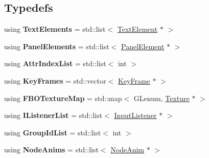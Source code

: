 \subsection*{Typedefs}
\begin{DoxyCompactItemize}
\item 
\hypertarget{namespaceEngine_a115b24f9c69682efbc9f470b471c05a3}{}using {\bfseries Text\+Elements} = std\+::list$<$ \hyperlink{classEngine_1_1TextElement}{Text\+Element} $\ast$ $>$\label{namespaceEngine_a115b24f9c69682efbc9f470b471c05a3}

\item 
\hypertarget{namespaceEngine_a0599e1309a8e5e56f947da08f8fde795}{}using {\bfseries Panel\+Elements} = std\+::list$<$ \hyperlink{classEngine_1_1PanelElement}{Panel\+Element} $\ast$ $>$\label{namespaceEngine_a0599e1309a8e5e56f947da08f8fde795}

\item 
\hypertarget{namespaceEngine_a86e109fbba3731eb26d862aa13c54761}{}using {\bfseries Attr\+Index\+List} = std\+::list$<$ int $>$\label{namespaceEngine_a86e109fbba3731eb26d862aa13c54761}

\item 
\hypertarget{namespaceEngine_a8c55142fb5e026b37f38e600d218440e}{}using {\bfseries Key\+Frames} = std\+::vector$<$ \hyperlink{classEngine_1_1KeyFrame}{Key\+Frame} $\ast$ $>$\label{namespaceEngine_a8c55142fb5e026b37f38e600d218440e}

\item 
\hypertarget{namespaceEngine_a855a7eb9d97b77ebc0d287a661ae631b}{}using {\bfseries F\+B\+O\+Texture\+Map} = std\+::map$<$ G\+Lenum, \hyperlink{classEngine_1_1Texture}{Texture} $\ast$ $>$\label{namespaceEngine_a855a7eb9d97b77ebc0d287a661ae631b}

\item 
\hypertarget{namespaceEngine_a1d515358567cf5c93f071411d6d59b74}{}using {\bfseries I\+Listener\+List} = std\+::list$<$ \hyperlink{classEngine_1_1InputListener}{Input\+Listener} $\ast$ $>$\label{namespaceEngine_a1d515358567cf5c93f071411d6d59b74}

\item 
\hypertarget{namespaceEngine_ab44f8e130652180f40a889d32f56f94e}{}using {\bfseries Group\+Id\+List} = std\+::list$<$ int $>$\label{namespaceEngine_ab44f8e130652180f40a889d32f56f94e}

\item 
\hypertarget{namespaceEngine_a9bf6df1203b9301805c7d245559f95ff}{}using {\bfseries Node\+Anims} = std\+::list$<$ \hyperlink{classEngine_1_1NodeAnim}{Node\+Anim} $\ast$ $>$\label{namespaceEngine_a9bf6df1203b9301805c7d245559f95ff}


\end{DoxyCompactItemize}
